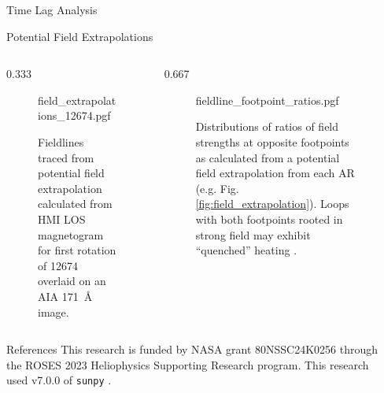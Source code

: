\documentclass[final]{beamer}
\newlength{\sepwidth}
\newlength{\colwidth}
\newcommand{\separatorcolumn}{\begin{column}{\sepwidth}\end{column}}
\begin{document}
\begin{frame}[t]
\begin{columns}[t]
\begin{column}{\colwidth}
\begin{block}{Time Lag Analysis}
  \end{block}

  \vspace{-35pt}

  \begin{block}{Potential Field Extrapolations}

    \vspace{-35pt}

    \begin{columns}[T]
      \begin{column}{0.333\colwidth}
        \begin{figure}
          \centering
          {field_extrapolations_12674.pgf}
          \caption{Fieldlines traced from potential field extrapolation calculated from HMI LOS magnetogram for \textcolor{C0}{first} rotation of 12674 overlaid on an AIA \SI{171}{\angstrom} image.} 
          \label{fig:field_extrapolation}
        \end{figure}
      \end{column}
      \begin{column}{0.667\colwidth}
        \begin{figure}
          \centering
          {fieldline_footpoint_ratios.pgf}
          \caption{Distributions of ratios of field strengths at opposite footpoints as calculated from a potential field extrapolation from each AR (e.g. Fig. \autoref{fig:field_extrapolation}). Loops with both footpoints rooted in strong field may exhibit ``quenched'' heating \citep{tiwari_new_2017}.} 
          \label{fig:fieldline_footpoint_ratios}
        \end{figure}
      \end{column}
    \end{columns}

  \end{block}

  \vspace{-25pt}

  \begin{block}{References}
    \scriptsize
    This research is funded by NASA grant 80NSSC24K0256 through the ROSES 2023 Heliophysics Supporting Research program.
    This research used v7.0.0 of \texttt{sunpy} \citep{the_sunpy_community_sunpy_2020}.
    \begin{multicols}{2}
      
      
    \end{multicols}
  \end{block}

\end{column}

\separatorcolumn
\end{columns}
\end{frame}
\end{document}
